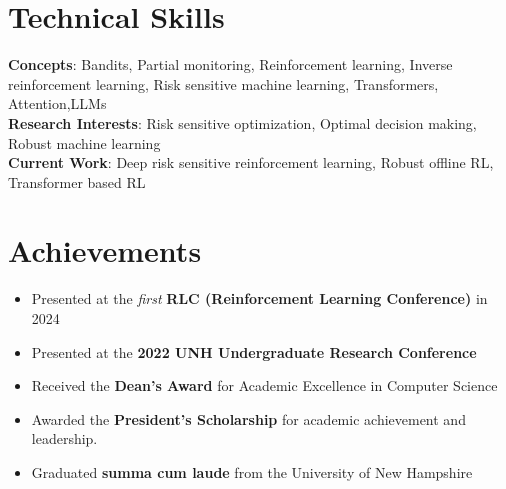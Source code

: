 \documentclass[letterpaper,11pt]{article}
\begin{document}
\section{Technical Skills}
    \begin{itemize}[leftmargin=0.15in, label={}]
	\small{\item{
		\textbf{Concepts}{: Bandits, Partial monitoring, Reinforcement learning, Inverse reinforcement learning, Risk sensitive machine learning, Transformers, Attention,LLMs} \\
		\textbf{Research Interests}{: Risk sensitive optimization, Optimal decision making, Robust machine learning } \\
                \textbf{Current Work}{: Deep risk sensitive reinforcement learning, Robust offline RL, Transformer based RL} \\
	}}
    \end{itemize}
\vfill
\section{Achievements}
\begin{itemize} %
    \item Presented at the \emph{first} \textbf{RLC (Reinforcement Learning Conference)} in 2024
    \item Presented at the \textbf{2022 UNH Undergraduate Research Conference}
    \item Received the \textbf{Dean's Award} for Academic Excellence in Computer Science
    \item Awarded the \textbf{President's Scholarship} for academic achievement and leadership.
    \item Graduated \textbf{summa cum laude} from the University of New Hampshire
\end{itemize} %
\end{document}
